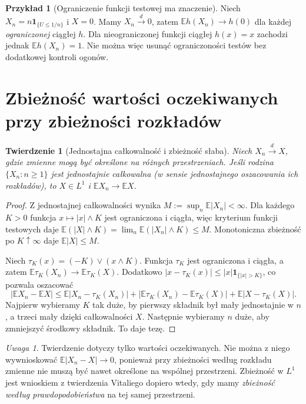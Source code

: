 \documentclass[11pt,a4paper,oneside]{report}
\numberwithin{equation}{chapter}
\theoremstyle{plain}
\newtheorem{twierdzenie}{Twierdzenie}[chapter]
\theoremstyle{definition}
\newtheorem{przyklad}{Przykład}[chapter]
\theoremstyle{remark}
\newtheorem{uwaga}{Uwaga}[chapter]
\newcommand{\E}{\mathbb{E}}
\newcommand{\ind}[1]{\mathbf{1}_{#1}}
\begin{document}
\begin{przyklad}[Ograniczenie funkcji testowej ma znaczenie]
Niech $X_n=n\ind{\{U\leq1/n\}}$ i $X=0$.
Mamy $X_n\xrightarrow{d}0$, zatem
$\E h(X_n)\to h(0)$ dla każdej \emph{ograniczonej}
ciągłej $h$. Dla nieograniczonej funkcji ciągłej
$h(x)=x$ zachodzi jednak $\E h(X_n)=1$.
Nie można więc usunąć ograniczoności testów
bez dodatkowej kontroli ogonów.
\end{przyklad}

\section{Zbieżność wartości oczekiwanych przy zbieżności rozkładów}

\begin{twierdzenie}[Jednostajna całkowalność i zbieżność słaba]
Niech $X_n\xrightarrow{d}X$, gdzie zmienne mogą być
określone na różnych przestrzeniach. Jeśli rodzina
$\{X_n:n\geq1\}$ jest jednostajnie całkowalna
(w sensie jednostajnego oszacowania ich rozkładów),
to $X\in L^1$ i $\E X_n\to\E X$.
\end{twierdzenie}
\begin{proof}
Z jednostajnej całkowalności wynika
$M:=\sup_n\E|X_n|<\infty$. Dla każdego $K>0$
funkcja $x\mapsto|x|\wedge K$ jest ograniczona
i ciągła, więc kryterium funkcji testowych daje
$\E(|X|\wedge K)=\lim_n\E(|X_n|\wedge K)\leq M$.
Monotoniczna zbieżność po $K\uparrow\infty$ daje
$\E|X|\leq M$.

Niech $\tau_K(x)=(-K)\vee(x\wedge K)$.
Funkcja $\tau_K$ jest ograniczona i ciągła, a zatem
$\E\tau_K(X_n)\to\E\tau_K(X)$. Dodatkowo
$|x-\tau_K(x)|\leq |x|\ind{\{|x|>K\}}$,
co pozwala oszacować
\[
|\E X_n-\E X|\leq
\E|X_n-\tau_K(X_n)|
+|\E\tau_K(X_n)-\E\tau_K(X)|
+\E|X-\tau_K(X)|.
\]
Najpierw wybieramy $K$ tak duże, by pierwszy składnik
był mały jednostajnie w $n$, a trzeci mały dzięki
całkowalności $X$. Następnie wybieramy $n$ duże,
aby zmniejszyć środkowy składnik. To daje tezę.
\end{proof}

\begin{uwaga}
Twierdzenie dotyczy tylko wartości oczekiwanych.
Nie można z niego wywnioskować $\E|X_n-X|\to0$,
ponieważ przy zbieżności według rozkładu zmienne nie
muszą być nawet określone na wspólnej przestrzeni.
Zbieżność w $L^1$ jest wnioskiem z twierdzenia Vitaliego
dopiero wtedy, gdy mamy \emph{zbieżność według
prawdopodobieństwa} na tej samej przestrzeni.
\end{uwaga}
\end{document}
